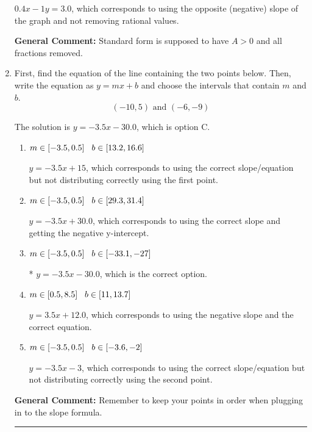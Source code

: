 \documentclass{extbook}[14pt]
\newcommand{\litem}[1]{\item #1

\rule{\textwidth}{0.4pt}}
\begin{document}
\begin{enumerate}
{\begin{enumerate}[label=\Alph*.]
 $0.4x - 1y = 3.0$, which corresponds to using the opposite (negative) slope of the graph and not removing rational values.
\end{enumerate}

\textbf{General Comment:} Standard form is supposed to have $A > 0$ and all fractions removed.
}
\litem{
First, find the equation of the line containing the two points below. Then, write the equation as $ y=mx+b $ and choose the intervals that contain $m$ and $b$.
\[ (-10, 5) \text{ and } (-6, -9) \]

The solution is \( y = -3.5x -30.0 \), which is option C.\begin{enumerate}[label=\Alph*.]
\item \( m \in [-3.5, 0.5] \hspace*{3mm} b \in [13.2, 16.6] \)

 $y = -3.5x + 15$, which corresponds to using the correct slope/equation but not distributing correctly using the first point.
\item \( m \in [-3.5, 0.5] \hspace*{3mm} b \in [29.3, 31.4] \)

 $y = -3.5x + 30.0$, which corresponds to using the correct slope and getting the negative y-intercept.
\item \( m \in [-3.5, 0.5] \hspace*{3mm} b \in [-33.1, -27] \)

* $y = -3.5x -30.0$, which is the correct option.
\item \( m \in [0.5, 8.5] \hspace*{3mm} b \in [11, 13.7] \)

 $y = 3.5x + 12.0$, which corresponds to using the negative slope and the correct equation.
\item \( m \in [-3.5, 0.5] \hspace*{3mm} b \in [-3.6, -2] \)

 $y = -3.5x -3$, which corresponds to using the correct slope/equation but not distributing correctly using the second point.
\end{enumerate}

\textbf{General Comment:} Remember to keep your points in order when plugging in to the slope formula.
}
\end{enumerate}
\end{document}
